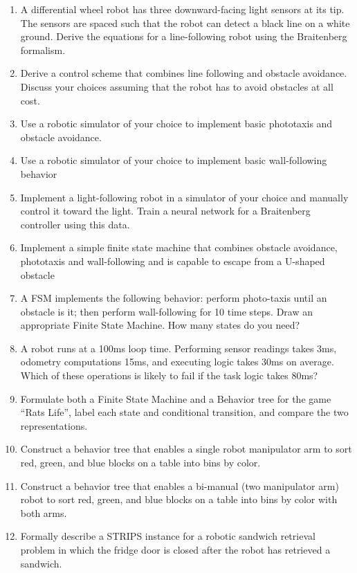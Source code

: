 \begin{enumerate}
\item A differential wheel robot has three downward-facing light sensors at its tip. The sensors are spaced such that the robot can detect a black line on a white ground. Derive the equations for a line-following robot using the Braitenberg formalism.
\item Derive a control scheme that combines line following and obstacle avoidance. Discuss your choices assuming that the robot has to avoid obstacles at all cost.
\item Use a robotic simulator of your choice to implement basic phototaxis and obstacle avoidance.
\item Use a robotic simulator of your choice to implement basic wall-following behavior
\item Implement a light-following robot in a simulator of your choice and manually control it toward the light. Train a neural network for a Braitenberg controller using this data.
\item Implement a simple finite state machine that combines obstacle avoidance, phototaxis and wall-following and is capable to escape from a U-shaped obstacle
\item A FSM implements the following behavior: perform photo-taxis until an obstacle is it; then perform wall-following for 10 time steps. Draw an appropriate Finite State Machine. How many states do you need?
\item A robot runs at a 100ms loop time. Performing sensor readings takes 3ms, odometry computations 15ms, and executing logic takes 30ms on average. Which of these operations is likely to fail if the task logic takes 80ms?
\item Formulate both a Finite State Machine and a Behavior tree for the game ``Rats Life'', label each state and conditional transition, and compare the two representations.
\item Construct a behavior tree that enables a single robot manipulator arm to sort red, green, and blue blocks on a table into bins by color.
\item Construct a behavior tree that enables a bi-manual (two manipulator arm) robot to sort red, green, and blue blocks on a table into bins by color with both arms.
\item Formally describe a STRIPS instance for a robotic sandwich retrieval problem in which the fridge door is closed after the robot has retrieved a sandwich. 
\end{enumerate}\normalsize

